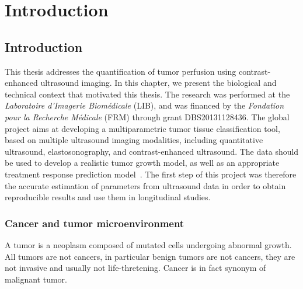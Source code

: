 \part*{Introduction}
\chapter{Introduction}\label{chapter:intro}
This thesis addresses the quantification of tumor perfusion using contrast-enhanced ultrasound imaging.
In this chapter, we present the biological and technical context that motivated this thesis.
The research was performed at the {\em Laboratoire d'Imagerie Biom\'edicale} (LIB), and was financed by the {\em Fondation pour la Recherche M\'edicale} (FRM) through grant DBS20131128436.
The global project aims at developing a multiparametric tumor tissue classification tool, based on multiple ultrasound imaging modalities, including quantitative ultrasound, elastosonography, and contrast-enhanced ultrasound.
The data should be used to develop a realistic tumor growth model, as well as an appropriate treatment response prediction model~\cite{Ribba:2011cl}.
The first step of this project was therefore the accurate estimation of parameters from ultrasound data in order to obtain reproducible results and use them in longitudinal studies.

\section{Cancer and tumor microenvironment}
\label{sec:IntroCancer}
A tumor is a neoplasm composed of mutated cells undergoing abnormal growth.
All tumors are not cancers, in particular benign tumors are not cancers, they are not invasive and usually not life-thretening.
Cancer is in fact synonym of malignant tumor.

